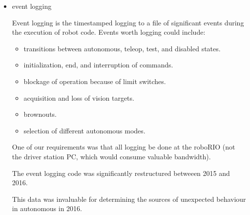 \documentclass[]{article}
\begin{document}
\begin{itemize}[topsep=0pt]

\item event logging

Event logging is the timestamped logging to a file of significant events during the execution of robot code.
Events worth logging could include:
\begin{itemize}[noitemsep,topsep=0pt]
\item transitions between autonomous, teleop, test, and disabled states.
\item initialization, end, and interruption of commands.
\item blockage of operation because of limit switches.
\item acquisition and loss of vision targets.
\item brownouts.
\item selection of different autonomous modes.
\end{itemize}

One of our requirements was that all logging be done at the roboRIO (not the driver station PC, which would consume valuable bandwidth).

The event logging code was significantly restructured betweeen 2015 and 2016.

This data was invaluable for determining the sources of unexpected behaviour in autonomous in 2016.


\end{itemize}
\end{document}
